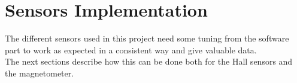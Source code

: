 \chapter{Sensors Implementation}\label{chap:sensorsImplementation}
The different sensors used in this project need some tuning from the software part to work as expected in a consistent way and give valuable data.\\
The next sections describe how this can be done both for the Hall sensors and the magnetometer.